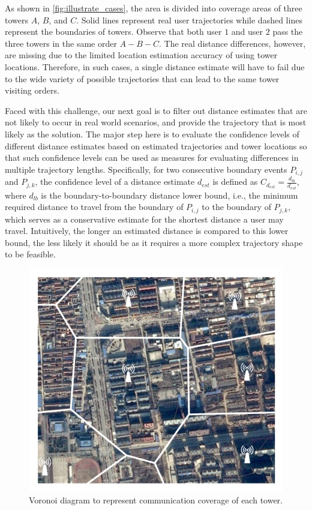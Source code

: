 As shown in \autoref{fig:illustrate_cases}, the area is divided into coverage areas of three towers $A$, $B$, and $C$. Solid lines represent real user trajectories while dashed lines represent the boundaries of towers. Observe that both user $1$ and user $2$ pass the three towers in the same order $A - B - C$. The real distance differences, however, are missing due to the limited location estimation accuracy of using tower locations. Therefore, in such cases, a single distance estimate will have to fail due to the wide variety of possible trajectories that can lead to the same tower visiting orders.

Faced with this challenge, our next goal is to filter out distance estimates that are not likely to occur in real world scenarios, and provide the trajectory that is most likely as the solution. The major step here is to evaluate the confidence levels of different distance estimates based on estimated trajectories and tower locations so that such confidence levels can be used as measures for evaluating differences in multiple trajectory lengths. Specifically, for two consecutive boundary events $P_{i,j}$ and $P_{j,k}$, the confidence level of a distance estimate $d_{est}$ is defined as $C_{d_{est}} = \frac{d_{lb}}{d_{est}}$, where $d_{lb}$ is the boundary-to-boundary distance lower bound, i.e., the minimum required distance to travel from the boundary of $P_{i,j}$ to the boundary of $P_{j,k}$, which serves as a conservative estimate for the shortest distance a user may travel. Intuitively, the longer an estimated distance is compared to this lower bound, the less likely it should be as it requires a more complex trajectory shape to be feasible.

\begin{figure}[h]
    \centering
    \includegraphics[width=0.9\linewidth]{./figures/voronoi_illustrate.pdf}
    \vspace{-0.1in}
    \caption{Voronoi diagram to represent communication coverage of each tower.}
		\label{fig:voronoi}
\end{figure}

